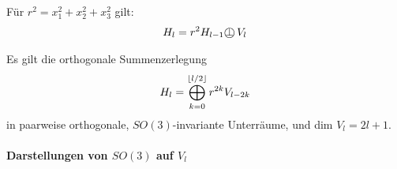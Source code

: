 \begin{bemerkung}
    Für $r^2 = x_1^2 + x_2^2 + x_3^2$ gilt:
    \begin{align*}
        H_l = r^2 H_{l-1} \dsumme V_l
    \end{align*}
\end{bemerkung}

\begin{satz}
    Es gilt die orthogonale Summenzerlegung
    \begin{align*}
        H_l = \bigoplus_{k=0}^{\lfloor l/2 \rfloor} r^{2k} V_{l-2k}
    \end{align*}
    in paarweise orthogonale, $SO(3)$-invariante Unterräume, und dim
    $V_l = 2l+1$.
\end{satz}

\paragraph{Darstellungen von $SO(3)$ auf $V_l$}

